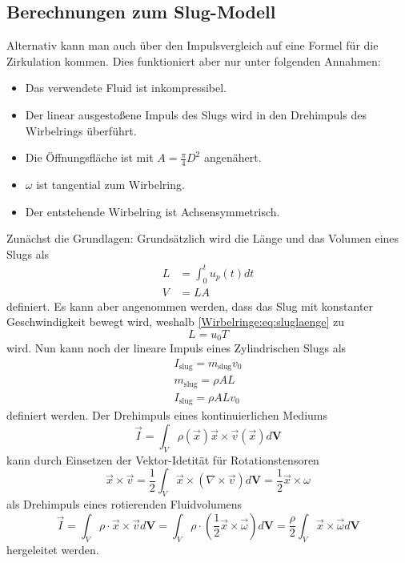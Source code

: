 \subsection{Berechnungen zum Slug-Modell}
Alternativ kann man auch über den Impulsvergleich auf eine Formel für die Zirkulation kommen.
Dies funktioniert aber nur unter folgenden Annahmen:
\begin{itemize}
    \item Das verwendete Fluid ist inkompressibel.
    \item Der linear ausgestoßene Impuls des Slugs wird in den Drehimpuls des Wirbelrings überführt.
    \item Die Öffnungsfläche ist mit $A = \frac{\pi}{4} D^2$ angenähert.
    \item $\omega$ ist tangential zum Wirbelring.
    \item Der entstehende Wirbelring ist Achsensymmetrisch.
\end{itemize} 

Zunächst die Grundlagen:
Grundsätzlich wird die Länge und das Volumen eines Slugs als
\begin{align}
    L
    &=
    \int_{0}^{t}u_p(t)dt\\
    \label{Wirbelringe:eq:sluglaenge}
    V
    &=
    LA
\end{align}
definiert.
Es kann aber angenommen werden, dass das Slug mit konstanter Geschwindigkeit bewegt wird, weshalb \eqref{Wirbelringe:eq:sluglaenge} zu
\begin{equation}
    L
    =
    u_0T
\end{equation}
wird.
Nun kann noch der lineare Impuls eines Zylindrischen Slugs als
\begin{align}
    I_{\text{slug}}
    =
    m_{\text{slug}}v_0\\
    m_{\text{slug}}
    =
    \rho AL\\
    I_{\text{slug}}
    =
    \rho ALv_0
    \label{Wirbelringe:eq:slugImp}
\end{align}
definiert werden.
Der Drehimpuls eines kontinuierlichen Mediums
\begin{equation*}
    \vec{I}
    =
    \int_{V}\rho(\vec{x})\vec{x}\times\vec{v}(\vec{x})d\mathbf{V}
\end{equation*}
kann durch Einsetzen der Vektor-Idetität für Rotationstensoren \cite{Wirbelringe:batchelor1967}
\begin{equation*}
    \vec{x}\times\vec{v}
    =
    \frac{1}{2}\int_{V}\vec{x}\times(\nabla\times\vec{v})d\mathbf{V}
    =
    \frac{1}{2}\vec{x}\times\omega
\end{equation*}
als Drehimpuls eines rotierenden Fluidvolumens 
\begin{equation}
    \vec{I}
    =
    \int_{V}\rho\cdot\vec{x}\times\vec{v}d\mathbf{V}
    =
    \int_{V}\rho\cdot(\frac{1}{2}\vec{x}\times\vec{\omega})d\mathbf{V}
    =
    \frac{\rho}{2}\int_{V}\vec{x}\times\vec{\omega}d\mathbf{V}
    \label{Wirbelringe:eq:Drehimpuls}
\end{equation}
hergeleitet werden. 

